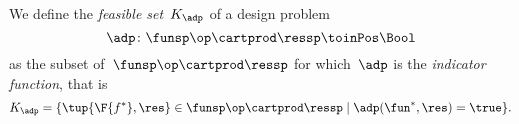 


%
%


\begin{definition}
    \label{def:dp-feasible-set}
    We define the \emph{feasible set}~$K_\adp$ of a design problem~
    \begin{equation}
        \label{eq:generic-design-prob}
        \adp\colon \funsp\op \cartprod \ressp \toinPos \Bool
    \end{equation}
    as the subset of~$\funsp \op\cartprod \ressp$ for which~$\adp$ is the \emph{indicator function}, that is%
    \begin{equation}
        \label{eq:design-prob-as-upper-set}
        K_\adp = \{ \tup{\F{f^*},\res} \in \funsp \op\cartprod \ressp  \mid %
        \adp(\fun^*, \res) = \true %
        \}.
    \end{equation}
\end{definition}

